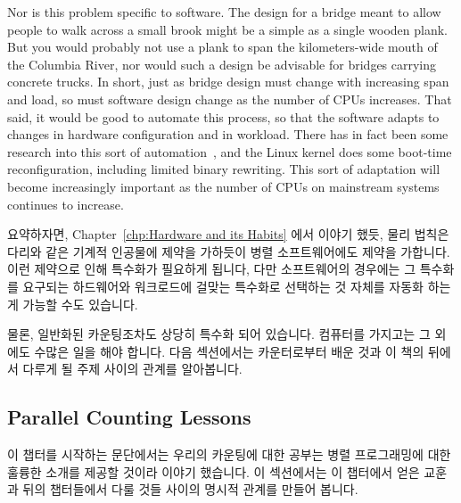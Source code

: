 Nor is this problem specific to software.
The design for a bridge meant to allow people to walk across a small brook
might be a simple as a single wooden plank.
But you would probably not use a plank to span the kilometers-wide mouth of
the Columbia River, nor would such a design be advisable for bridges
carrying concrete trucks.
In short, just as bridge design must change with increasing span and load,
so must software design change as the number of CPUs increases.
That said, it would be good to automate this process, so that the
software adapts to changes in hardware configuration and in workload.
There has in fact been some research into this sort of
automation~\cite{Appavoo03a,Soules03a}, and the Linux kernel does some
boot-time reconfiguration, including limited binary rewriting.
This sort of adaptation will become increasingly important as the
number of CPUs on mainstream systems continues to increase.
\fi

요약하자면, Chapter~\ref{chp:Hardware and its Habits} 에서 이야기 했듯, 물리
법칙은 다리와 같은 기계적 인공물에 제약을 가하듯이 병렬 소프트웨어에도 제약을
가합니다.
이런 제약으로 인해 특수화가 필요하게 됩니다, 다만 소프트웨어의 경우에는 그
특수화를 요구되는 하드웨어와 워크로드에 걸맞는 특수화로 선택하는 것 자체를
자동화 하는게 가능할 수도 있습니다.

물론, 일반화된 카운팅조차도 상당히 특수화 되어 있습니다.
컴퓨터를 가지고는 그 외에도 수많은 일을 해야 합니다.
다음 섹션에서는 카운터로부터 배운 것과 이 책의 뒤에서 다루게 될 주제 사이의
관계를 알아봅니다.

\subsection{Parallel Counting Lessons}
\label{sec:count:Parallel Counting Lessons}

이 챕터를 시작하는 문단에서는 우리의 카운팅에 대한 공부는 병렬 프로그래밍에
대한 훌륭한 소개를 제공할 것이라 이야기 했습니다.
이 섹션에서는 이 챕터에서 얻은 교훈과 뒤의 챕터들에서 다룰 것들 사이의 명시적
관계를 만들어 봅니다.

